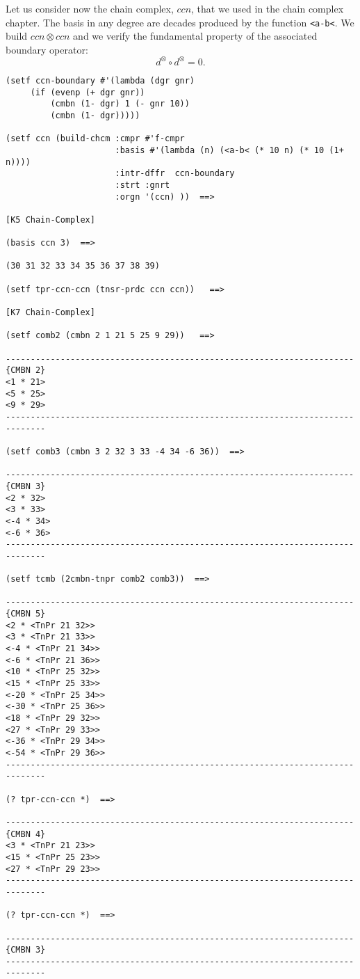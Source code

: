 Let us consider now the  chain complex, $ccn$, that we used in the chain complex chapter.
The basis in any degree are decades produced by the function {\tt <a-b<}. We build $ccn\otimes ccn$
and we verify the fundamental property of the associated boundary operator:
$$d^\otimes \circ d^\otimes=0.$$
\newpage
{\footnotesize\begin{verbatim}
(setf ccn-boundary #'(lambda (dgr gnr)
     (if (evenp (+ dgr gnr))
         (cmbn (1- dgr) 1 (- gnr 10))
         (cmbn (1- dgr)))))

(setf ccn (build-chcm :cmpr #'f-cmpr
                      :basis #'(lambda (n) (<a-b< (* 10 n) (* 10 (1+ n))))
                      :intr-dffr  ccn-boundary
                      :strt :gnrt
                      :orgn '(ccn) ))  ==>

[K5 Chain-Complex]

(basis ccn 3)  ==>

(30 31 32 33 34 35 36 37 38 39)

(setf tpr-ccn-ccn (tnsr-prdc ccn ccn))   ==>

[K7 Chain-Complex]

(setf comb2 (cmbn 2 1 21 5 25 9 29))   ==>

----------------------------------------------------------------------{CMBN 2}
<1 * 21>
<5 * 25>
<9 * 29>
------------------------------------------------------------------------------

(setf comb3 (cmbn 3 2 32 3 33 -4 34 -6 36))  ==>

----------------------------------------------------------------------{CMBN 3}
<2 * 32>
<3 * 33>
<-4 * 34>
<-6 * 36>
------------------------------------------------------------------------------

(setf tcmb (2cmbn-tnpr comb2 comb3))  ==>

----------------------------------------------------------------------{CMBN 5}
<2 * <TnPr 21 32>>
<3 * <TnPr 21 33>>
<-4 * <TnPr 21 34>>
<-6 * <TnPr 21 36>>
<10 * <TnPr 25 32>>
<15 * <TnPr 25 33>>
<-20 * <TnPr 25 34>>
<-30 * <TnPr 25 36>>
<18 * <TnPr 29 32>>
<27 * <TnPr 29 33>>
<-36 * <TnPr 29 34>>
<-54 * <TnPr 29 36>>
------------------------------------------------------------------------------

(? tpr-ccn-ccn *)  ==>

----------------------------------------------------------------------{CMBN 4}
<3 * <TnPr 21 23>>
<15 * <TnPr 25 23>>
<27 * <TnPr 29 23>>
------------------------------------------------------------------------------

(? tpr-ccn-ccn *)  ==>

----------------------------------------------------------------------{CMBN 3}
------------------------------------------------------------------------------
\end{verbatim}}
\newpage

